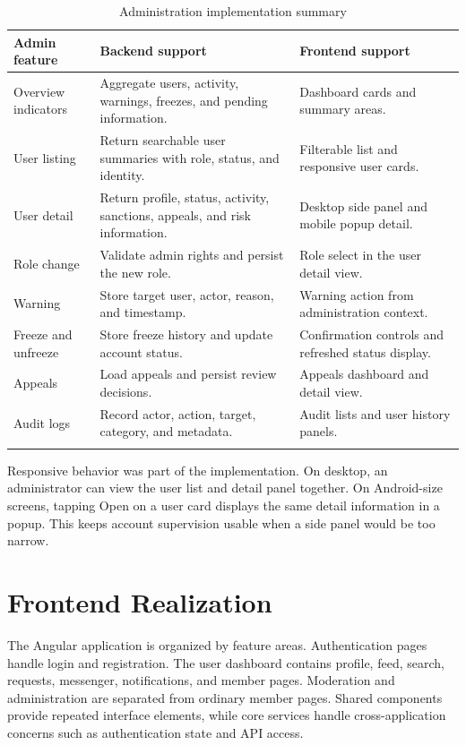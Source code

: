 \begin{longtable}{|m{3.4cm}|m{4.9cm}|m{5.6cm}|}
\hline
\textbf{Admin feature} & \textbf{Backend support} & \textbf{Frontend support} \\
\hline
Overview indicators & Aggregate users, activity, warnings, freezes, and pending information. & Dashboard cards and summary areas. \\
\hline
User listing & Return searchable user summaries with role, status, and identity. & Filterable list and responsive user cards. \\
\hline
User detail & Return profile, status, activity, sanctions, appeals, and risk information. & Desktop side panel and mobile popup detail. \\
\hline
Role change & Validate admin rights and persist the new role. & Role select in the user detail view. \\
\hline
Warning & Store target user, actor, reason, and timestamp. & Warning action from administration context. \\
\hline
Freeze and unfreeze & Store freeze history and update account status. & Confirmation controls and refreshed status display. \\
\hline
Appeals & Load appeals and persist review decisions. & Appeals dashboard and detail view. \\
\hline
Audit logs & Record actor, action, target, category, and metadata. & Audit lists and user history panels. \\
\hline
\caption{Administration implementation summary}
\end{longtable}

Responsive behavior was part of the implementation. On desktop, an administrator can view the user list and detail panel together. On Android-size screens, tapping Open on a user card displays the same detail information in a popup. This keeps account supervision usable when a side panel would be too narrow.

\section{Frontend Realization}

The Angular application is organized by feature areas. Authentication pages handle login and registration. The user dashboard contains profile, feed, search, requests, messenger, notifications, and member pages. Moderation and administration are separated from ordinary member pages. Shared components provide repeated interface elements, while core services handle cross-application concerns such as authentication state and API access.

